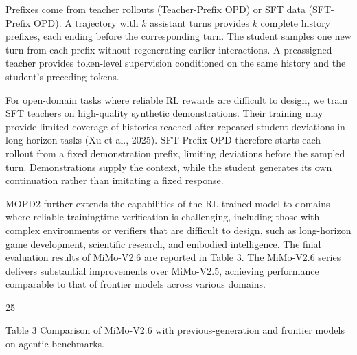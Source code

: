 \documentclass[
  10
]{article}
\begin{document}
Prefixes come from teacher rollouts (Teacher-Prefix OPD) or SFT data
(SFT-Prefix OPD). A trajectory with $k$ assistant turns provides $k$
complete history prefixes, each ending before the corresponding turn.
The student samples one new turn from each prefix without regenerating
earlier interactions. A preassigned teacher provides token-level
supervision conditioned on the same history and the student's preceding
tokens.

For open-domain tasks where reliable RL rewards are difficult to design,
we train SFT teachers on high-quality synthetic demonstrations. Their
training may provide limited coverage of histories reached after
repeated student deviations in long-horizon tasks (Xu et al., 2025).
SFT-Prefix OPD therefore starts each rollout from a fixed demonstration
prefix, limiting deviations before the sampled turn. Demonstrations
supply the context, while the student generates its own continuation
rather than imitating a fixed response.

MOPD2 further extends the capabilities of the RL-trained model to
domains where reliable trainingtime verification is challenging,
including those with complex environments or verifiers that are difficult
to design, such as long-horizon game development, scientific research,
and embodied intelligence. The final evaluation results of MiMo-V2.6 are
reported in Table 3. The MiMo-V2.6 series delivers substantial
improvements over MiMo-V2.5, achieving performance comparable to that of
frontier models across various domains.

25

Table 3 Comparison of MiMo-V2.6 with previous-generation and frontier
models on agentic benchmarks.
\end{document}

